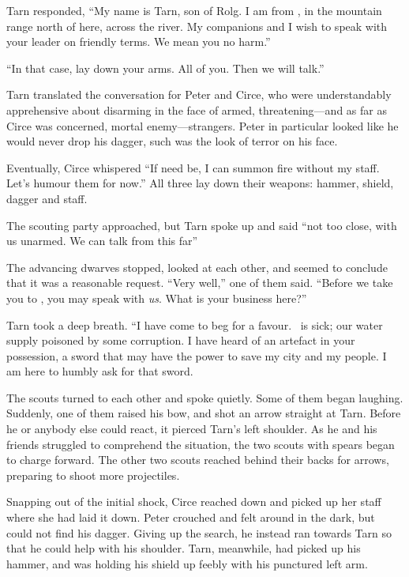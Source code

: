 Tarn responded, ``My name is Tarn, son of Rolg.  I am from \korbarthrond, in the mountain range north of here, across the river.  My companions and I wish to speak with your leader on friendly terms.  We mean you no harm.''

``In that case, lay down your arms.  All of you.  Then we will talk.''

Tarn translated the conversation for Peter and Circe, who were understandably apprehensive about disarming in the face of armed, threatening---and as far as Circe was concerned, mortal enemy---strangers.  Peter in particular looked like he would never drop his dagger, such was the look of terror on his face.

Eventually, Circe whispered ``If need be, I can summon fire without my staff.  Let's humour them for now.''  All three lay down their weapons: hammer, shield, dagger and staff.

The scouting party approached, but Tarn spoke up and said ``not too close, with us unarmed.  We can talk from this far''

The advancing dwarves stopped, looked at each other, and seemed to conclude that it was a reasonable request.  ``Very well,'' one of them said.  ``Before we take you to \tholkunrond, you may speak with \emph{us}.  What is your business here?''

Tarn took a deep breath.  ``I have come to beg for a favour.  \korbarthrond\ is sick; our water supply poisoned by some corruption.  I have heard of an artefact in your possession, a sword that may have the power to save my city and my people.  I am here to humbly ask for that sword.

The scouts turned to each other and spoke quietly.  Some of them began laughing.  Suddenly, one of them raised his bow, and shot an arrow straight at Tarn.  Before he or anybody else could react, it pierced Tarn's left shoulder.  As he and his friends struggled to comprehend the situation, the two scouts with spears began to charge forward.  The other two scouts reached behind their backs for arrows, preparing to shoot more projectiles.

Snapping out of the initial shock, Circe reached down and picked up her staff where she had laid it down.  Peter crouched and felt around in the dark, but could not find his dagger.  Giving up the search, he instead ran towards Tarn so that he could help with his shoulder.  Tarn, meanwhile, had picked up his hammer, and was holding his shield up feebly with his punctured left arm.

